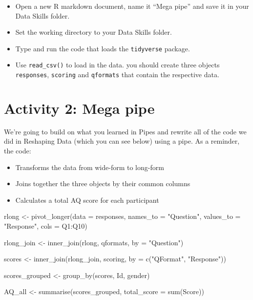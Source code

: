 \documentclass[
  oneside]{book}
\newenvironment{Shaded}{\begin{snugshade}}{\end{snugshade}}
\newcommand{\AttributeTok}[1]{\textcolor[rgb]{0.77,0.63,0.00}{#1}}
\newcommand{\FunctionTok}[1]{\textcolor[rgb]{0.00,0.00,0.00}{#1}}
\newcommand{\NormalTok}[1]{#1}
\newcommand{\OtherTok}[1]{\textcolor[rgb]{0.56,0.35,0.01}{#1}}
\newcommand{\SpecialCharTok}[1]{\textcolor[rgb]{0.00,0.00,0.00}{#1}}
\newcommand{\StringTok}[1]{\textcolor[rgb]{0.31,0.60,0.02}{#1}}
\providecommand{\tightlist}{%
  \setlength{\itemsep}{0pt}\setlength{\parskip}{0pt}}
\begin{document}
\begin{itemize}
\tightlist
\item
  Open a new R markdown document, name it ``Mega pipe'' and save it in your Data Skills folder.
\item
  Set the working directory to your Data Skills folder.
\item
  Type and run the code that loads the \texttt{tidyverse} package.
\item
  Use \texttt{read\_csv()} to load in the data. you should create three objects \texttt{responses}, \texttt{scoring} and \texttt{qformats} that contain the respective data.
\end{itemize}

\hypertarget{activity-2-mega-pipe}{%
\section{Activity 2: Mega pipe}\label{activity-2-mega-pipe}}

We're going to build on what you learned in Pipes and rewrite all of the code we did in Reshaping Data (which you can see below) using a pipe. As a reminder, the code:

\begin{itemize}
\tightlist
\item
  Transforms the data from wide-form to long-form
\item
  Joins together the three objects by their common columns
\item
  Calculates a total AQ score for each participant
\end{itemize}

\begin{Shaded}
\begin{Highlighting}[]
\NormalTok{rlong }\OtherTok{\textless{}{-}} \FunctionTok{pivot\_longer}\NormalTok{(}\AttributeTok{data =}\NormalTok{ responses, }
                      \AttributeTok{names\_to =} \StringTok{"Question"}\NormalTok{,  }
                      \AttributeTok{values\_to =} \StringTok{"Response"}\NormalTok{,}
                      \AttributeTok{cols =}\NormalTok{ Q1}\SpecialCharTok{:}\NormalTok{Q10)}

\NormalTok{rlong\_join }\OtherTok{\textless{}{-}} \FunctionTok{inner\_join}\NormalTok{(rlong, qformats, }\AttributeTok{by =} \StringTok{"Question"}\NormalTok{)}

\NormalTok{scores }\OtherTok{\textless{}{-}} \FunctionTok{inner\_join}\NormalTok{(rlong\_join, scoring, }\AttributeTok{by =} \FunctionTok{c}\NormalTok{(}\StringTok{"QFormat"}\NormalTok{, }\StringTok{"Response"}\NormalTok{))}

\NormalTok{scores\_grouped }\OtherTok{\textless{}{-}} \FunctionTok{group\_by}\NormalTok{(scores, Id, gender)}

\NormalTok{AQ\_all }\OtherTok{\textless{}{-}} \FunctionTok{summarise}\NormalTok{(scores\_grouped, }\AttributeTok{total\_score =} \FunctionTok{sum}\NormalTok{(Score))}
\end{Highlighting}
\end{Shaded}
\end{document}
